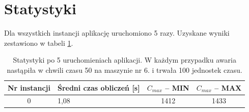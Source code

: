 \documentclass[printmode,oneside]{mgr}
\begin{document}
\section{Statystyki}
Dla wszystkich instancji aplikację uruchomiono 5 razy. Uzyskane wyniki zestawiono w tabeli \ref{tab_res_one}.
\begin{table}[ht]
\renewcommand{\arraystretch}{1.2}
\begin{tabularx}{\textwidth}{|c|X|c|c|}
\hline
\textbf{Nr instancji} & \textbf{Średni czas obliczeń [s]} & \textbf{$C_{max}$ -- MIN} & \textbf{$C_{max}$ -- MAX}\\
\hline
0 & 1,08 & 1412 & 1433\\      
\hline
\end{tabularx}
\caption{Statystyki po 5 uruchomieniach aplikacji. W każdym przypadku awaria nastąpiła w chwili czasu 50 na maszynie nr 6. i trwała 100 jednostek czasu.}
\label{tab_res_one}
\renewcommand{\arraystretch}{1.0}
\end{table}
%
\clearpage
{}
\end{document}
